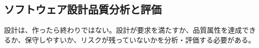 \subsection{ソフトウェア設計品質分析と評価}

設計は、作ったら終わりではない。設計が要求を満たすか、品質属性を達成できるか、保守しやすいか、リスクが残っていないかを分析・評価する必要がある。

